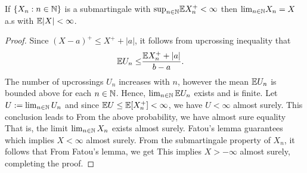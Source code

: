 \documentclass[a4paper,10pt,english]{article}
\begin{document}
\begin{thm} 
\label{MartingaleConvergenceTheorem} 
If $\{X_n : n \in \mathbb{N}\}$ is a submartingale with ${\sup}_{n\in \mathbb{N}} \mathbb{E} X_n^{+} < \infty$ then ${\lim}_{n\in \mathbb{N}} X_n=X$ a.s with $\mathbb{E}|X|<\infty$.
\end{thm}
\begin{proof} 
Since $(X-a)^{+}\leq X^{+}+|a|$, it follows from upcrossing inequality that   		
\begin{align*}
\mathbb{E} U_n \leq& \frac{\mathbb{E} X_n^{+} +|a|}{b-a}.
\end{align*}
The number of upcrossings $U_n$ increases with $n$, however the mean $\mathbb{E} U_n$ is bounded above for each $n \in \mathbb{N}$. 
Hence, $\lim_{n \in \mathbb{N}}\mathbb{E} U_n$ exists and is finite. 
Let $U := \lim_{n \in \mathbb{N}} U_n$ and since $\mathbb{E} U \leq \mathbb{E} [X_n^{+}] < \infty$, we have $U<\infty$ almost surely. 
This conclusion leads to  
From the above probability, we have almost sure equality 
That is, the limit $\lim_{n \in \mathbb{N}}X_n$ exists almost surely. 
Fatou's lemma guarantees
which implies $X<\infty$  almost surely. 
From the submartingale property of $X_n$, it follows that 
From Fatou's lemma, we get
This implies $X>-\infty$ almost surely, completing the proof. 
\end{proof}
\end{document}
